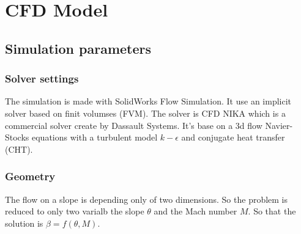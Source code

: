 \newpage
\section{CFD Model}
\subsection{Simulation parameters}
\label{subsec:simulation_parameters}

\subsubsection{Solver settings}

The simulation is made with SolidWorks Flow Simulation. It use an implicit solver based on finit volumses (FVM). The solver is CFD NIKA which is a commercial solver create by Dassault Systems. It's base on a 3d flow Navier-Stocks equations with a turbulent model $k-\epsilon$ and conjugate heat transfer (CHT).

\subsubsection{Geometry}

The flow on a slope is depending only of two dimensions. So the problem is reduced to only two varialb the slope $\theta$ and the Mach number $M$. So that the solution is $\beta = f(\theta,M)$.

